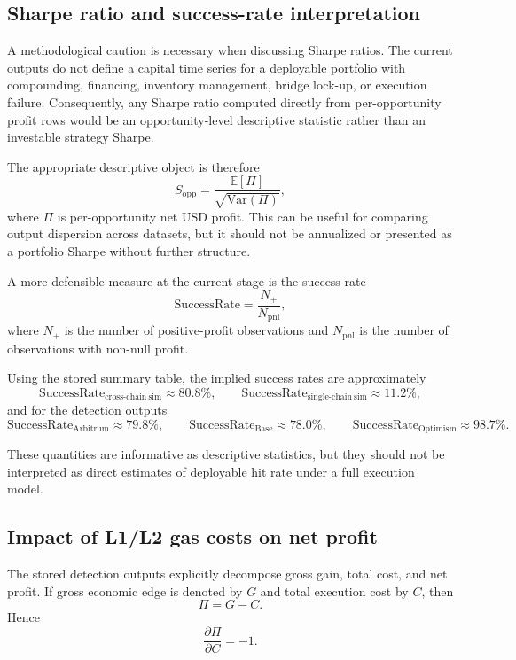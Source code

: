 \documentclass[11pt]{article}
\begin{document}
\subsection{Sharpe ratio and success-rate interpretation}

A methodological caution is necessary when discussing Sharpe ratios. The current outputs do not define a capital time series for a deployable portfolio with compounding, financing, inventory management, bridge lock-up, or execution failure. Consequently, any Sharpe ratio computed directly from per-opportunity profit rows would be an opportunity-level descriptive statistic rather than an investable strategy Sharpe.

The appropriate descriptive object is therefore
\[
S_{\mathrm{opp}} = \frac{\mathbb{E}[\Pi]}{\sqrt{\mathrm{Var}(\Pi)}},
\]
where \(\Pi\) is per-opportunity net USD profit. This can be useful for comparing output dispersion across datasets, but it should not be annualized or presented as a portfolio Sharpe without further structure.

A more defensible measure at the current stage is the success rate
\[
\mathrm{SuccessRate}=\frac{N_{+}}{N_{\mathrm{pnl}}},
\]
where \(N_{+}\) is the number of positive-profit observations and \(N_{\mathrm{pnl}}\) is the number of observations with non-null profit.

Using the stored summary table, the implied success rates are approximately
\[
\mathrm{SuccessRate}_{\mathrm{cross\mbox{-}chain\ sim}}\approx 80.8\%,
\qquad
\mathrm{SuccessRate}_{\mathrm{single\mbox{-}chain\ sim}}\approx 11.2\%,
\]
and for the detection outputs
\[
\mathrm{SuccessRate}_{\mathrm{Arbitrum}}\approx 79.8\%,
\qquad
\mathrm{SuccessRate}_{\mathrm{Base}}\approx 78.0\%,
\qquad
\mathrm{SuccessRate}_{\mathrm{Optimism}}\approx 98.7\%.
\]

These quantities are informative as descriptive statistics, but they should not be interpreted as direct estimates of deployable hit rate under a full execution model.

\subsection{Impact of L1/L2 gas costs on net profit}

The stored detection outputs explicitly decompose gross gain, total cost, and net profit. If gross economic edge is denoted by \(G\) and total execution cost by \(C\), then
\[
\Pi = G-C.
\]
Hence
\[
\frac{\partial \Pi}{\partial C}=-1.
\]
\end{document}
